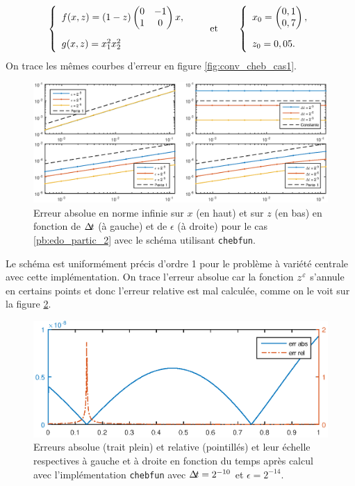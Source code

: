 \begin{equation} \label{pb:edo_partic_2}
\left\{ \begin{array}{l}
f(x,z) = (1-z)\begin{pmatrix} 0 & -1 \\ 1 & 0 \end{pmatrix} x , \\
g(x,z) = x_1^2 x_2^2 \vphantom{\displaystyle\sum^0}
\end{array} \right. 
\qquad \text{et} \qquad 
\left\{ \begin{array}{l}
x_0 = \begin{pmatrix} 0,1 \\ 0,7 \end{pmatrix} , \\
z_0 = 0,05 . \vphantom{\displaystyle\sum^0}
\end{array} \right.
\end{equation}
%
On trace les mêmes courbes d'erreur en figure \ref{fig:conv_cheb_cas1}. 
\begin{figure}[!h]
\centering
\includegraphics[width=\textwidth]{img/chap3/cheb/conv_abs_cheb_cas2.eps}
\caption{Erreur absolue en norme infinie sur $x$ (en haut) et sur $z$ (en bas) en fonction de $\Delta\!\!\!\ t$ (à gauche) et de $\epsilon$ (à droite) pour le cas \eqref{pb:edo_partic_2} avec le schéma utilisant \texttt{chebfun}.}
\label{fig:conv_cheb_cas2}
\end{figure}
Le schéma est uniformément précis d'ordre 1 pour le problème à variété centrale avec cette implémentation. 
On trace l'erreur absolue car la fonction $z^{\varepsilon}$ s'annule en certains points et donc l'erreur relative est mal calculée, comme on le voit sur la figure \ref{fig:erreur_cheb_cas2}. 
\begin{figure}[!h]
\centering
\includegraphics[scale=.85]{img/chap3/cheb/errors_cheb_cas2.eps}
\caption{Erreurs absolue (trait plein) et relative (pointillés) et leur échelle respectives à gauche et à droite en fonction du temps après calcul avec l'implémentation \texttt{chebfun} avec $\Delta\!\!\!\ t = 2^{-10}$ et $\epsilon = 2^{-14}$.}
\label{fig:erreur_cheb_cas2}
\end{figure}
